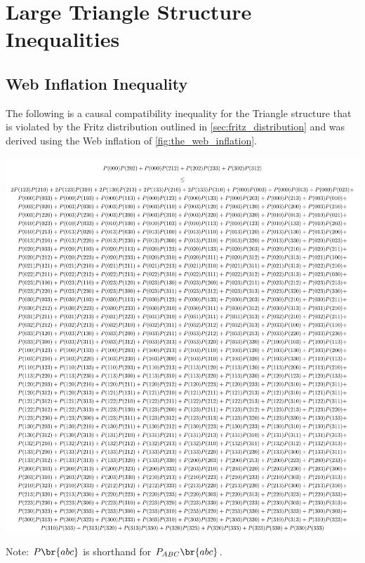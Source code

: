 \documentclass[aps, 10pt, english, twoside, pra, nofootinbib, tightenlines, longbibliography, superscriptaddress]{revtex4-1}
\begin{document}
    \clearpage
    \section{Large Triangle Structure Inequalities}
    \label{sec:web_inequalities}
    \subsection{Web Inflation Inequality}
    \label{sec:web_inequality}
    The following is a causal compatibility inequality for the Triangle structure that is violated by the Fritz distribution outlined in \cref{sec:fritz_distribution} and was derived using the Web inflation of \cref{fig:the_web_inflation}.
    \begin{center}
        \vspace{-0.2in}
        \includegraphics[width=\linewidth]{../../figures/inequalities/no_symwitness_ineq_print_standalone}
    \end{center}
    Note: $\prob\br{abc}$ is shorthand for $\prob[ABC]\br{abc}$.
    \clearpage
\end{document}
